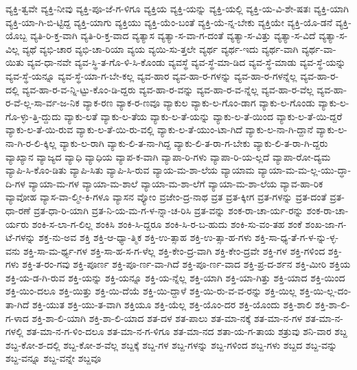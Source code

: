 {ವ್ಯಕ್ತಿ-ತ್ವವೇ
ವ್ಯಕ್ತಿ-ನೀವು
ವ್ಯಕ್ತಿ-ಪೂ-ಜೆ-ಗ-ಳಿಗೂ
ವ್ಯಕ್ತಿಯ
ವ್ಯಕ್ತಿ-ಯನ್ನು
ವ್ಯಕ್ತಿ-ಯಲ್ಲಿ
ವ್ಯಕ್ತಿ-ಯ-ವಿ-ಶೇ-ಷತಃ
ವ್ಯಕ್ತಿ-ಯಾಗಿ
ವ್ಯಕ್ತಿ-ಯಾ-ಗಿ-ಬಿ-ಟ್ಟಿದ್ದ
ವ್ಯಕ್ತಿ-ಯಾಗು
ವ್ಯಕ್ತಿಯು
ವ್ಯಕ್ತಿ-ಯೆಂ-ಬಂತೆ
ವ್ಯಕ್ತಿ-ಯೆ-ನ್ನ-ಬೇಕು
ವ್ಯಕ್ತಿಯೇ
ವ್ಯಕ್ತಿ-ಯೊ-ಡನೆ
ವ್ಯಕ್ತಿ-ಯೊಬ್ಬ
ವ್ಯತಿ-ರಿ-ಕ್ತ-ವಾಗಿ
ವ್ಯತಿ-ರಿ-ಕ್ತ-ವಾದ
ವ್ಯತ್ಯಾಸ
ವ್ಯತ್ಯಾ-ಸ-ವಾ-ಗ-ದಂತೆ
ವ್ಯತ್ಯಾ-ಸ-ವಿತ್ತು
ವ್ಯತ್ಯಾ-ಸ-ವಿದೆ
ವ್ಯತ್ಯಾ-ಸ-ವಿಲ್ಲ
ವ್ಯಥೆ
ವ್ಯಭಿ-ಚಾರ
ವ್ಯಭಿ-ಚಾ-ರಿಯಾ
ವ್ಯಯ
ವ್ಯಯಿ-ಸು-ತ್ತಲೇ
ವ್ಯರ್ಥ
ವ್ಯರ್ಥ-ಇದು
ವ್ಯರ್ಥ-ವಾಗಿ
ವ್ಯರ್ಥ-ವಾ-ಯಿತು
ವ್ಯವ-ಧಾ-ನವೇ
ವ್ಯವ-ಸ್ಥಿ-ತ-ಗೊ-ಳಿ-ಸಿ-ಕೊಂಡು
ವ್ಯವಸ್ಥೆ
ವ್ಯವ-ಸ್ಥೆ-ಮಾ-ಡಿದ
ವ್ಯವ-ಸ್ಥೆ-ಮಾಡು
ವ್ಯವ-ಸ್ಥೆ-ಯನ್ನು
ವ್ಯವ-ಸ್ಥೆ-ಯನ್ನೂ
ವ್ಯವ-ಸ್ಥೆ-ಯಾ-ಗ-ಬೇ-ಕಲ್ಲ
ವ್ಯವ-ಹಾರ
ವ್ಯವ-ಹಾ-ರ-ಗಳನ್ನು
ವ್ಯವ-ಹಾ-ರ-ಗಳನ್ನೆಲ್ಲ
ವ್ಯವ-ಹಾ-ರ-ದಲ್ಲಿ
ವ್ಯವ-ಹಾ-ರ-ವ-ನ್ನಿ-ಟ್ಟು-ಕೊಂ-ಡಿ-ದ್ದರು
ವ್ಯವ-ಹಾ-ರ-ವನ್ನು
ವ್ಯವ-ಹಾ-ರ-ವ-ನ್ನೆಲ್ಲ
ವ್ಯವ-ಹಾ-ರ-ವೆಲ್ಲ
ವ್ಯವ-ಹಾ-ರ-ವೆ-ಲ್ಲ-ಸಾ-ರ್ವ-ಜ-ನಿಕ
ವ್ಯಾಕ-ರಣ
ವ್ಯಾಕ-ರ-ಣವೂ
ವ್ಯಾಕುಲ
ವ್ಯಾಕು-ಲ-ಗೊಂ-ಡಾಗ
ವ್ಯಾಕು-ಲ-ಗೊಂಡು
ವ್ಯಾಕು-ಲ-ಗೊ-ಳ್ಳು-ತ್ತಿ-ದ್ದುದು
ವ್ಯಾಕು-ಲತೆ
ವ್ಯಾಕು-ಲ-ತೆಯ
ವ್ಯಾಕು-ಲ-ತೆ-ಯನ್ನು
ವ್ಯಾಕು-ಲ-ತೆ-ಯಿಂದ
ವ್ಯಾಕು-ಲ-ತೆ-ಯಿ-ದ್ದರೆ
ವ್ಯಾಕು-ಲ-ತೆ-ಯಿ-ರುವ
ವ್ಯಾಕು-ಲ-ತೆ-ಯಿ-ರು-ವಲ್ಲಿ
ವ್ಯಾಕು-ಲ-ತೆ-ಯುಂ-ಟಾ-ಗಿದೆ
ವ್ಯಾಕು-ಲ-ನಾ-ಗಿ-ದ್ದಾನೆ
ವ್ಯಾಕು-ಲ-ನಾ-ಗಿ-ರ-ಲಿ-ಕ್ಕಿಲ್ಲ
ವ್ಯಾಕು-ಲ-ರಾಗಿ
ವ್ಯಾಕು-ಲಿ-ತ-ನಾ-ಗಿದ್ದ
ವ್ಯಾಕು-ಲಿ-ತ-ರಾ-ಗ-ಬೇಕು
ವ್ಯಾಕು-ಲಿ-ತ-ರಾ-ಗಿ-ದ್ದರು
ವ್ಯಾಖ್ಯಾನ
ವ್ಯಾಜ್ಯದ
ವ್ಯಾಧಿ
ವ್ಯಾಧಿಯ
ವ್ಯಾಪ-ಕ-ವಾಗಿ
ವ್ಯಾಪಾ-ರಿ-ಗಳು
ವ್ಯಾಪಾ-ರಿ-ಯ-ಲ್ಲದೆ
ವ್ಯಾಪಾ-ರೋ-ದ್ಯಮ
ವ್ಯಾಪಿ-ಸಿ-ಕೊಂ-ಡಿತು
ವ್ಯಾಪಿ-ಸಿತು
ವ್ಯಾಪಿ-ಸಿ-ರುವ
ವ್ಯಾಯ-ಮ-ಶಾ-ಲೆಯ
ವ್ಯಾಯಾಮ
ವ್ಯಾಯಾ-ಮ-ಮ-ಲ್ಲ-ಯು-ದ್ಧಾ-ದಿ-ಗಳ
ವ್ಯಾಯಾ-ಮ-ಗಳ
ವ್ಯಾಯಾ-ಮ-ಶಾಲೆ
ವ್ಯಾಯಾ-ಮ-ಶಾ-ಲೆಗೆ
ವ್ಯಾಯಾ-ಮ-ಶಾ-ಲೆಯ
ವ್ಯಾವ-ಹಾ-ರಿಕ
ವ್ಯಾವೋಹ
ವ್ಯಾಸ-ವಾ-ಲ್ಮೀ-ಕಿ-ಗಳೂ
ವ್ಯಾಸನ
ವ್ಯೋಂ
ವ್ರಜೇಂ-ದ್ರ-ನಾಥ
ವ್ರತ
ವ್ರತ-ಕ್ಕೀಗ
ವ್ರತ-ಗಳನ್ನು
ವ್ರತ-ದಂತೆ
ವ್ರತ-ಧಾ-ರಣೆ
ವ್ರತ-ಧಾ-ರಿ-ಯಾಗಿ
ವ್ರತ-ನಿ-ಯ-ಮ-ಗ-ಳ-ನ್ನಾ-ಚ-ರಿಸಿ
ವ್ರತ-ವನ್ನು
ಶಂಕ-ರಾ-ಚಾ-ರ್ಯ-ರನ್ನು
ಶಂಕ-ರಾ-ಚಾ-ರ್ಯರು
ಶಂಕಿ-ಸ-ಲಾ-ಗ-ಲಿಲ್ಲ
ಶಂಕಿಸಿ
ಶಂಕಿ-ಸಿ-ದ್ದರೂ
ಶಂಕಿ-ಸಿ-ರ-ಬ-ಹುದು
ಶಂಕಿ-ಸು-ವಂ-ತಹ
ಶಂಕೆ
ಶಂಖ-ಜಾ-ಗ-ಟೆ-ಗಳನ್ನು
ಶಕ್ತ-ನು-ಅವ
ಶಕ್ತಿ
ಶಕ್ತಿ-ಆ-ಧ್ಯಾ-ತ್ಮಿಕ
ಶಕ್ತಿ-ಉ-ತ್ಸಾಹ
ಶಕ್ತಿ-ಉ-ತ್ಸಾ-ಹ-ಗಳು
ಶಕ್ತಿ-ಸಾ-ಧ್ಯ-ತೆ-ಗ-ಳ-ನ್ನು-ಳ್ಳ-ವನು
ಶಕ್ತಿ-ಸಾ-ಮ-ರ್ಥ್ಯ-ಗಳ
ಶಕ್ತಿ-ಸಾ-ಹ-ಸ-ಗ-ಳೆಲ್ಲ
ಶಕ್ತಿ-ಕೇಂ-ದ್ರ-ವಾಗಿ
ಶಕ್ತಿ-ಕೇಂ-ದ್ರವೇ
ಶಕ್ತಿ-ಗಳ
ಶಕ್ತಿ-ಗಳಿಂದ
ಶಕ್ತಿ-ಗಳು
ಶಕ್ತಿ-ತ-ರಂ-ಗವು
ಶಕ್ತಿ-ಪೂರ್ಣ
ಶಕ್ತಿ-ಪೂ-ರ್ಣ-ವಾ-ಗಿದೆ
ಶಕ್ತಿ-ಪೂ-ರ್ಣ-ವಾದ
ಶಕ್ತಿ-ಪ್ರ-ದ-ರ್ಶನ
ಶಕ್ತಿ-ಮೀರಿ
ಶಕ್ತಿಯ
ಶಕ್ತಿ-ಯ-ಡ-ಗಿ-ರುವ
ಶಕ್ತಿ-ಯನ್ನು
ಶಕ್ತಿ-ಯನ್ನೂ
ಶಕ್ತಿ-ಯ-ನ್ನೆಲ್ಲ
ಶಕ್ತಿ-ಯಾಗಿ
ಶಕ್ತಿ-ಯಾ-ಗಿತ್ತು
ಶಕ್ತಿ-ಯಾದ
ಶಕ್ತಿ-ಯಿಂದ
ಶಕ್ತಿ-ಯಿಂ-ದಲೂ
ಶಕ್ತಿ-ಯಿತ್ತು
ಶಕ್ತಿ-ಯಿ-ದೆಯೆ
ಶಕ್ತಿ-ಯಿ-ದ್ದಾಳೆ
ಶಕ್ತಿ-ಯಿ-ರು-ವ-ವ-ರನ್ನು
ಶಕ್ತಿ-ಯಿಲ್ಲ
ಶಕ್ತಿ-ಯಿ-ಲ್ಲ-ದಂ-ತಾ-ಗಿದೆ
ಶಕ್ತಿ-ಯುತ
ಶಕ್ತಿ-ಯು-ತ-ವಾಗಿ
ಶಕ್ತಿಯೂ
ಶಕ್ತಿ-ಯೆಲ್ಲ
ಶಕ್ತಿ-ಯೊಂ-ದರ
ಶಕ್ತಿ-ಯೊಂದು
ಶಕ್ತಿ-ಶಾಲಿ
ಶಕ್ತಿ-ಶಾ-ಲಿ-ಗ-ಳಾದ
ಶಕ್ತಿ-ಶಾ-ಲಿ-ಯಾಗಿ
ಶಕ್ತಿ-ಶಾ-ಲಿ-ಯಾದ
ಶತ-ದಳ
ಶತ-ಪಾಲು
ಶತ-ಮಾ-ನಕ್ಕೆ
ಶತ-ಮಾ-ನ-ಗಳ
ಶತ-ಮಾ-ನ-ಗಳಲ್ಲಿ
ಶತ-ಮಾ-ನ-ಗ-ಳಿಂ-ದಲೂ
ಶತ-ಮಾ-ನ-ಗ-ಳಿಗೂ
ಶತ-ಮಾ-ನದ
ಶತಾ-ಯ-ಗ-ತಾಯ
ಶತ್ರುವು
ಶನಿ-ವಾರ
ಶಬ್ದ
ಶಬ್ದ-ಕೋ-ಶ-ದಲ್ಲಿ
ಶಬ್ದ-ಕೋ-ಶ-ವೆಲ್ಲ
ಶಬ್ದಕ್ಕೆ
ಶಬ್ದ-ಗಳ
ಶಬ್ದ-ಗಳನ್ನು
ಶಬ್ದ-ಗಳಿಂದ
ಶಬ್ದ-ಗಳು
ಶಬ್ದದ
ಶಬ್ದ-ವನ್ನು
ಶಬ್ದ-ವನ್ನೂ
ಶಬ್ದ-ವನ್ನೇ
ಶಬ್ದವೂ
}
